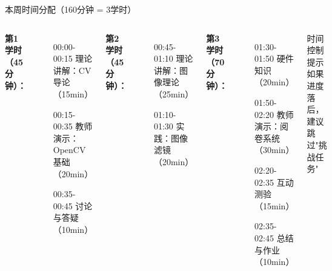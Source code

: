 \documentclass[aspectratio=169, 10pt]{beamer}
\begin{document}
\begin{frame}{本周时间分配（160分钟 = 3学时）}
    \begin{columns}
        \textbf{第1学时（45分钟）：}
        \begin{itemize}
            \item[00:00-00:15] 理论讲解：CV导论（15min）
            \item[00:15-00:35] 教师演示：OpenCV基础（20min）
            \item[00:35-00:45] 讨论与答疑（10min）
        \end{itemize}

        \textbf{第2学时（45分钟）：}
        \begin{itemize}
            \item[00:45-01:10] 理论讲解：图像理论（25min）
            \item[01:10-01:30] 实践：图像滤镜（20min）
        \end{itemize}

        \textbf{第3学时（70分钟）：}
        \begin{itemize}
            \item[01:30-01:50] 硬件知识（20min）
            \item[01:50-02:20] 教师演示：阅卷系统（30min）
            \item[02:20-02:35] 互动测验（15min）
            \item[02:35-02:45] 总结与作业（10min）
        \end{itemize}

        \vspace{0.5cm}
        \begin{alertblock}{时间控制提示}
        如果进度落后，建议跳过"挑战任务"
        \end{alertblock}
    \end{columns}
\end{frame}
\end{document}
